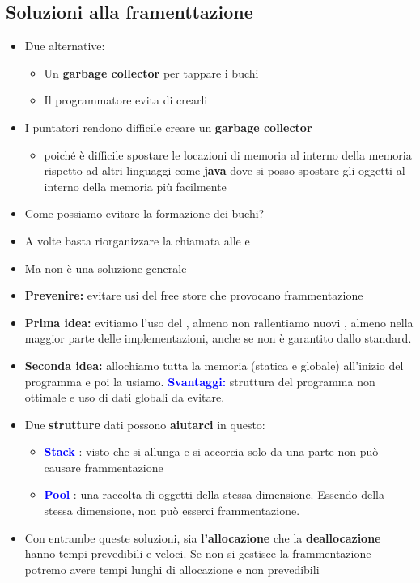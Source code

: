 \subsection{Soluzioni alla framenttazione}
\begin{itemize}
    \item Due alternative:
    \begin{itemize}
        \item  Un \textbf{garbage collector} per tappare i buchi
        \item  Il programmatore evita di crearli
    \end{itemize}
    \item I puntatori rendono difficile creare un \textbf{garbage collector}
        \begin{itemize}
            \item poiché è difficile spostare le locazioni di memoria al interno della memoria rispetto ad altri linguaggi come \textbf{java} dove si posso spostare gli oggetti al interno della memoria più facilmente 
        \end{itemize}
    \item Come possiamo evitare la formazione dei buchi?
    \item A volte basta riorganizzare la chiamata alle  e 
    \item Ma non è una soluzione generale
    \item \textbf{Prevenire:} evitare usi del free store che provocano
    frammentazione
    \item \textbf{Prima idea:} evitiamo l’uso del , almeno non
    rallentiamo nuovi , almeno nella maggior parte delle
    implementazioni, anche se non è garantito dallo standard.
    \item \textbf{Seconda idea:} allochiamo tutta la memoria (statica e
    globale) all’inizio del programma e poi la usiamo.\newline\newline
    \textcolor{blue}{\textbf{Svantaggi:}} struttura del programma non ottimale e uso di
    dati globali da evitare.
\item Due \textbf{strutture} dati possono \textbf{aiutarci} in questo:
    \begin{itemize}
        \item  \textcolor{blue}{\textbf{Stack}} : visto che si allunga e si accorcia solo da una
        parte non può causare frammentazione
        \item \textcolor{blue}{\textbf{Pool}} : una raccolta di oggetti della stessa
        dimensione. Essendo della stessa
        dimensione, non può esserci frammentazione.
    \end{itemize}
    \item Con entrambe queste soluzioni, sia \textbf{l’allocazione} che la
    \textbf{deallocazione} hanno tempi prevedibili e veloci.
    Se non si gestisce la frammentazione potremo avere tempi lunghi di allocazione e non prevedibili
\end{itemize}
